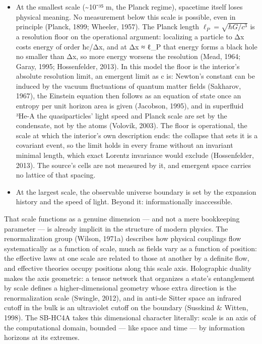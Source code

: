 \documentclass[
]{article}
\providecommand{\tightlist}{%
  \setlength{\itemsep}{0pt}\setlength{\parskip}{0pt}}
\begin{document}
\begin{itemize}
\tightlist
\item
  At the smallest scale (\textasciitilde10⁻³⁵ m, the Planck regime),
  spacetime itself loses physical meaning. No measurement below this
  scale is possible, even in principle (Planck, 1899; Wheeler, 1957).
  The Planck length \(\ell_P = \sqrt{\hbar G/c^3}\) is a resolution
  floor on the operational argument: localizing a particle to Δx costs
  energy of order ħc/Δx, and at Δx ≈ ℓ\_P that energy forms a black hole
  no smaller than Δx, so more energy worsens the resolution (Mead, 1964;
  Garay, 1995; Hossenfelder, 2013). In this model the floor is the
  interior's absolute resolution limit, an emergent limit as c is:
  Newton's constant can be induced by the vacuum fluctuations of quantum
  matter fields (Sakharov, 1967), the Einstein equation then follows as
  an equation of state once an entropy per unit horizon area is given
  (Jacobson, 1995), and in superfluid ³He-A the quasiparticles' light
  speed and Planck scale are set by the condensate, not by the atoms
  (Volovik, 2003). The floor is operational, the scale at which the
  interior's own description ends: the collapse that sets it is a
  covariant event, so the limit holds in every frame without an
  invariant minimal length, which exact Lorentz invariance would exclude
  (Hossenfelder, 2013). The source's cells are not measured by it, and
  emergent space carries no lattice of that spacing.
\item
  At the largest scale, the observable universe boundary is set by the
  expansion history and the speed of light. Beyond it: informationally
  inaccessible.
\end{itemize}

That scale functions as a genuine dimension --- and not a mere
bookkeeping parameter --- is already implicit in the structure of modern
physics. The renormalization group (Wilson, 1971a) describes how
physical couplings flow systematically as a function of scale, much as
fields vary as a function of position: the effective laws at one scale
are related to those at another by a definite flow, and effective
theories occupy positions along this scale axis. Holographic duality
makes the axis geometric: a tensor network that organizes a state's
entanglement by scale defines a higher-dimensional geometry whose extra
direction is the renormalization scale (Swingle, 2012), and in anti-de
Sitter space an infrared cutoff in the bulk is an ultraviolet cutoff on
the boundary (Susskind \& Witten, 1998). The SB-HC4A takes this
dimensional character literally: scale is an axis of the computational
domain, bounded --- like space and time --- by information horizons at
its extremes.
\end{document}
